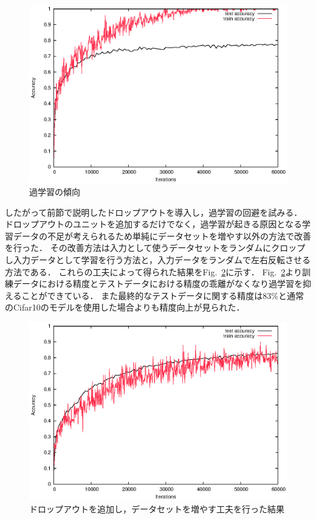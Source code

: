 \documentclass[a4paper,10pt]{jsarticle}
\begin{document}
\begin{figure}[tb]
  \begin{center}
    \includegraphics[clip,width=12cm]{./fig/eps/overtraining.eps}
  \end{center}
  \caption{過学習の傾向}
  \label{fig:過学習の傾向}
\end{figure}

したがって前節で説明したドロップアウトを導入し，過学習の回避を試みる．
ドロップアウトのユニットを追加するだけでなく，過学習が起きる原因となる学習データの不足が考えられるため単純にデータセットを増やす以外の方法で改善を行った．
その改善方法は入力として使うデータセットをランダムにクロップし入力データとして学習を行う方法と，入力データをランダムで左右反転させる方法である．
これらの工夫によって得られた結果をFig.~\ref{fig:ドロップアウトを追加し，データセットを増やす工夫を行った結果}に示す．
Fig.~\ref{fig:ドロップアウトを追加し，データセットを増やす工夫を行った結果}より訓練データにおける精度とテストデータにおける精度の乖離がなくなり過学習を抑えることができている．
また最終的なテストデータに関する精度は$83\%$と通常のCifar10のモデルを使用した場合よりも精度向上が見られた．

\begin{figure}[tb]
  \begin{center}
    \includegraphics[clip,width=12cm]{./fig/eps/dropout.eps}
  \end{center}
  \caption{ドロップアウトを追加し，データセットを増やす工夫を行った結果}
  \label{fig:ドロップアウトを追加し，データセットを増やす工夫を行った結果}
\end{figure}
\end{document}
